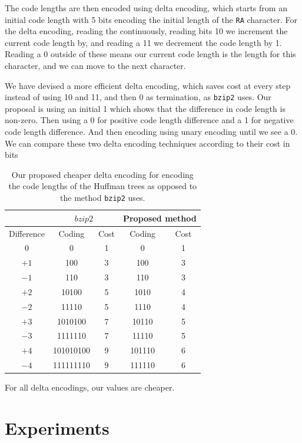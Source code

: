 \documentclass{article}
\begin{document}
The code lengths are then encoded using delta encoding, which starts from an initial code length with 5 bits encoding the initial length of the \texttt{RA} character. For the delta encoding, reading the continuously, reading bits 10 we increment the current code length by, and reading a 11 we decrement the code length by 1. Reading a 0 outside of these means our current code length is the length for this character, and we can move to the next character.

We have devised a more efficient delta encoding, which saves cost at every step instead of using 10 and 11, and then 0 as termination, as \texttt{bzip2} uses. Our proposal is using an initial 1 which shows that the difference in code length is non-zero. Then using a 0 for positive code length difference and a 1 for negative code length difference. And then encoding using unary encoding until we see a 0.
We can compare these two delta encoding techniques according to their cost in bits

\begin{table}[H]
    \centering
    \begin{tabular}{|c|c|c|c|c|}
        \hline
        & \multicolumn{2}{c|}{\(bzip2\)} & \multicolumn{2}{c|}{Proposed method} \\ \hline
        Difference & Coding & Cost & Coding & Cost \\ \hline
        0 & 0 & 1 & 0 & 1  \\ \hline
        \(+1\) & 100 & 3 & 100 & 3 \\ \hline
        \(-1\) & 110 & 3 & 110 & 3 \\ \hline
        \(+2\) & 10100 & 5 & 1010 & 4 \\ \hline
        \(-2\) & 11110 & 5 & 1110 & 4 \\ \hline
        \(+3\) & 1010100 & 7 & 10110 & 5 \\ \hline
        \(-3\) & 1111110 & 7 & 11110 & 5 \\ \hline
        \(+4\) & 101010100 & 9 & 101110 & 6 \\ \hline
        \(-4\) & 111111110 & 9 & 111110 & 6 \\ \hline
    \end{tabular}
    \caption{Our proposed cheaper delta encoding for encoding the code lengths of the Huffman trees as opposed to the method \texttt{bzip2} uses.}
    \label{tab:my_label}
\end{table}
For all delta encodings, our values are cheaper.


\section{Experiments}\label{sec:EXPERIMENTS}
\end{document}

